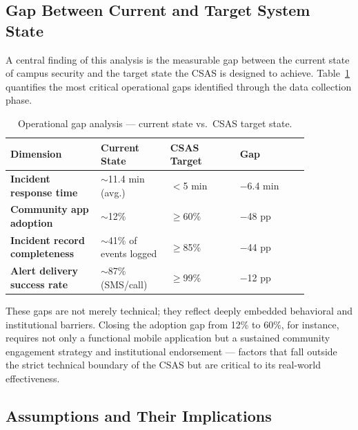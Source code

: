 \documentclass[12pt, onecolumn]{IEEEtran}
\begin{document}
\subsection{Gap Between Current and Target System State}

A central finding of this analysis is the measurable gap between the
current state of campus security and the target state the CSAS is
designed to achieve. Table~\ref{tab:gaps} quantifies the most critical
operational gaps identified through the data collection phase.

\begin{table}[h]
\centering
\caption{Operational gap analysis --- current state vs.\ CSAS target state.}
\label{tab:gaps}
\renewcommand{\arraystretch}{1.3}
\begin{tabular}{>{\bfseries\small}p{0.26\linewidth}
                >{\small}p{0.20\linewidth}
                >{\small}p{0.20\linewidth}
                >{\small}p{0.20\linewidth}}
\toprule
\textbf{Dimension} & \textbf{Current State} &
\textbf{CSAS Target} & \textbf{Gap} \\
\midrule
Incident response time
  & $\sim$11.4 min (avg.)
  & $<$5 min
  & $-$6.4 min \\
\rowcolor{rowgray}
Community app adoption
  & $\sim$12\%
  & $\geq$60\%
  & $-$48 pp \\
Incident record completeness
  & $\sim$41\% of events logged
  & $\geq$85\%
  & $-$44 pp \\
\rowcolor{rowgray}
Alert delivery success rate
  & $\sim$87\% (SMS/call)
  & $\geq$99\%
  & $-$12 pp \\
\bottomrule
\end{tabular}
\end{table}

These gaps are not merely technical; they reflect deeply embedded
behavioral and institutional barriers. Closing the adoption gap from
12\% to 60\%, for instance, requires not only a functional mobile
application but a sustained community engagement strategy and
institutional endorsement --- factors that fall outside the strict
technical boundary of the CSAS but are critical to its real-world
effectiveness.

\subsection{Assumptions and Their Implications}
\end{document}
